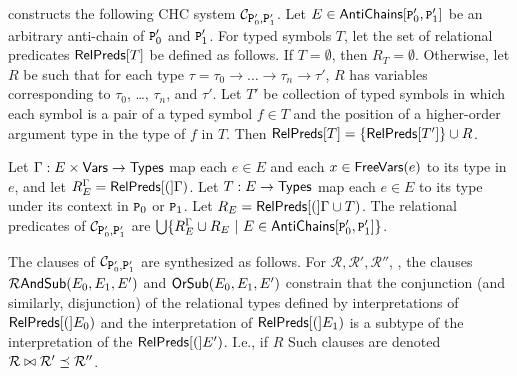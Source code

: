 %
\verifybnd constructs the following CHC system $\mathcal{C}_{
  \cc{P}_0', \cc{P}_1' }$.
Let $E \in \antichains{ \cc{P}_0' }{ \cc{P}_1' }$ be an arbitrary
anti-chain of $\cc{P}_0'$ and $\cc{P}_1'$.
For typed symbols $T$, let the set of relational predicates
$\mathsf{RelPreds}[ T ]$ be defined as follows.
If $T = \emptyset$, then $R_T = \emptyset$.
Otherwise, let $R$ be such that for each type $\tau = \tau_0
\rightarrow \ldots \rightarrow \tau_n \rightarrow \tau'$, $R$ has
variables corresponding to $\tau_0$, \ldots, $\tau_n$, and $\tau'$.
%
Let $T'$ be collection of typed symbols in which each symbol is a pair
of a typed symbol $f \in T$ and the position of a higher-order
argument type in the type of $f$ in $T$.
%
Then $\mathsf{RelPreds}[ T ] = \{  \mathsf{RelPreds}[  T'  ]  \} \cup  R $.

Let $\Gamma : E \times \mathsf{Vars} \to \mathsf{Types}$ map each $e \in E$ and each
$x \in \mathsf{FreeVars}(e)$ to its type in $e$, and let $R_E^{\Gamma} =
\mathsf{RelPreds}[ ( ]\Gamma)$.
%
Let $T: E \to \mathsf{Types}$ map each $e \in E$ to its type under its context
in $\cc{P}_0$ or $\cc{P}_1$.
%
%
Let $R_E = \mathsf{RelPreds}[ ( ]\Gamma \cup T)$.
%
The relational predicates of $\mathcal{C}_{ \cc{P}_0', \cc{P}_1' }$
are $\bigunion \setformer{ R_E^{\Gamma} \union R_E }{ E \in
  \antichains{ \cc{P}_0' }{ \cc{P}_1' }}$.

The clauses of $\mathcal{C}_{ \cc{P}_0', \cc{P}_1' }$ are synthesized
as follows.
For $\mathcal{R}, \mathcal{R}', \mathcal{R}''$,
%
%
, the
clauses $\mathcal{R}\mathsf{AndSub}(E_0, E_1, E')$ and $\mathsf{OrSub}(E_0, E_1, E')$ constrain
that the conjunction (and similarly, disjunction) of the relational
types defined by interpretations of $\mathsf{RelPreds}[ ( ]E_0)$ and the
interpretation of $\mathsf{RelPreds}[ ( ]E_1)$ is a subtype of the
interpretation of the $\mathsf{RelPreds}[ ( ]E')$.
%
I.e., if $R$
%
%
Such clauses are denoted $\mathcal{R} \bowtie \mathcal{R}' \preceq
\mathcal{R}''$.

